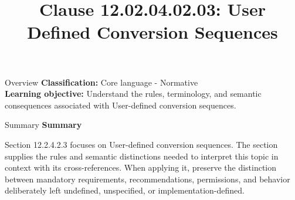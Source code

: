 \documentclass[10pt,letterpaper]{article}
\title{Clause 12.02.04.02.03: User Defined Conversion Sequences}
\author{}
\date{}
\begin{document}
\maketitle
\begin{CornellOverviewBox}{Overview}
\textbf{Classification:} Core language - Normative\\[2pt]
\textbf{Learning objective:} Understand the rules, terminology, and semantic consequences associated with User-defined conversion sequences.
\end{CornellOverviewBox}\begin{CornellSummaryBox}{Summary}
{\sffamily\bfseries\color{Accent} Summary}\par\vspace{3pt}Section 12.2.4.2.3 focuses on User-defined conversion sequences. The section supplies the rules and semantic distinctions needed to interpret this topic in context with its cross-references. When applying it, preserve the distinction between mandatory requirements, recommendations, permissions, and behavior deliberately left undefined, unspecified, or implementation-defined.
\end{CornellSummaryBox}
\end{document}
